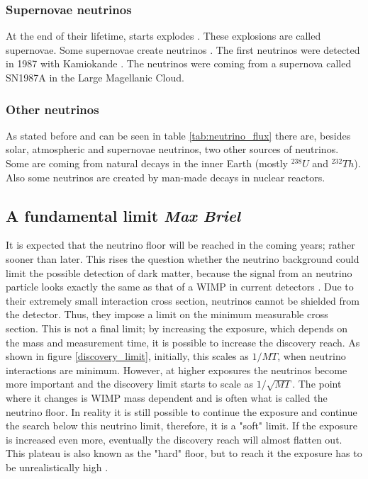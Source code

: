 \documentclass{article}
\begin{document}
\subsubsection{Supernovae neutrinos}
At the end of their lifetime, starts explodes \cite{raffelt1996stars}. These explosions are called supernovae. Some supernovae create neutrinos \cite{Beacom:2010kk}. The first neutrinos were detected in 1987 with Kamiokande \cite{Totsuka:1988iyh}. The neutrinos were coming from a supernova called SN1987A in the Large Magellanic Cloud.

\subsubsection{Other neutrinos}
As stated before and can be seen in table \ref{tab:neutrino_flux} there are, besides solar, atmospheric and supernovae neutrinos, two other sources of neutrinos. Some are coming from natural decays in the inner Earth (mostly ${}^{238}U$ and ${}^{232}Th$). Also some neutrinos are created by man-made decays in nuclear reactors.

\subsection{A fundamental limit \small{\textit{Max Briel}}}

It is expected that the neutrino floor will be reached in the coming years; rather sooner than later. This rises the question whether the neutrino background could limit the possible detection of dark matter, because the signal from an neutrino particle looks exactly the same as that of a WIMP in current detectors \cite{Gutlein:2010tq,Billard:2013qya}. Due to their extremely small interaction cross section, neutrinos cannot be shielded from the detector. Thus, they impose a limit on the minimum measurable cross section. This is not a final limit; by increasing the exposure, which depends on the mass and measurement time, it is possible to increase the discovery reach. As shown in figure \ref{discovery_limit}, initially, this scales as $1/MT$, when neutrino interactions are minimum. However, at higher exposures the neutrinos become more important and the discovery limit starts to scale as $1/\sqrt{MT}$. The point where it changes is WIMP mass dependent and is often what is called the neutrino floor. In reality it is still possible to continue the exposure and continue the search below this neutrino limit, therefore, it is a "soft" limit. If the exposure is increased even more, eventually the discovery reach will almost flatten out. This plateau is also known as the "hard" floor, but to reach it the exposure has to be unrealistically high \cite{Wyenberg:2018eyv}. 
\end{document}
